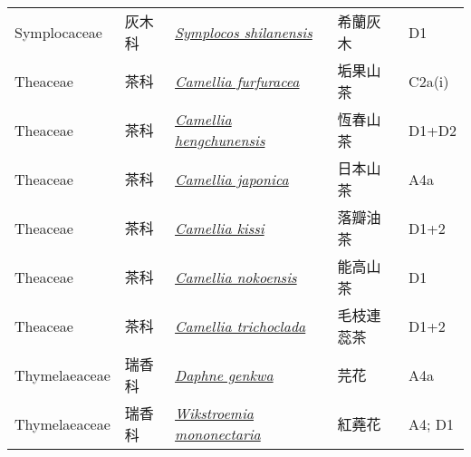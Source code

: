 {\begin{longtable}{L{2.5cm}L{2cm}L{5cm}L{2.5cm}L{3cm}}
    Symplocaceae & 灰木科 & \href{http://www.theplantlist.org/tpl1.1/search?q=Symplocos+shilanensis}{\textit{Symplocos shilanensis} } & 希蘭灰木 & D1    \\
    Theaceae & 茶科 & \href{http://www.theplantlist.org/tpl1.1/search?q=Camellia+furfuracea}{\textit{Camellia furfuracea} } & 垢果山茶 & C2a(i)    \\
    Theaceae & 茶科 & \href{http://www.theplantlist.org/tpl1.1/search?q=Camellia+hengchunensis}{\textit{Camellia hengchunensis} } & 恆春山茶 & D1+D2    \\
    Theaceae & 茶科 & \href{http://www.theplantlist.org/tpl1.1/search?q=Camellia+japonica}{\textit{Camellia japonica} } & 日本山茶 & A4a    \\
    Theaceae & 茶科 & \href{http://www.theplantlist.org/tpl1.1/search?q=Camellia+kissi}{\textit{Camellia kissi} } & 落瓣油茶 & D1+2    \\
    Theaceae & 茶科 & \href{http://www.theplantlist.org/tpl1.1/search?q=Camellia+nokoensis}{\textit{Camellia nokoensis} } & 能高山茶 & D1    \\
    Theaceae & 茶科 & \href{http://www.theplantlist.org/tpl1.1/search?q=Camellia+trichoclada}{\textit{Camellia trichoclada} } & 毛枝連蕊茶 & D1+2    \\
    Thymelaeaceae & 瑞香科 & \href{http://www.theplantlist.org/tpl1.1/search?q=Daphne+genkwa}{\textit{Daphne genkwa} } & 芫花 & A4a    \\
    Thymelaeaceae & 瑞香科 & \href{http://www.theplantlist.org/tpl1.1/search?q=Wikstroemia+mononectaria}{\textit{Wikstroemia mononectaria} } & 紅蕘花 & A4; D1    \\

\end{longtable}}
